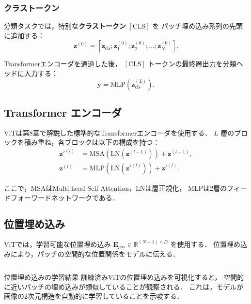 \subsubsection{クラストークン}

分類タスクでは，特別な\textbf{クラストークン} $[\mathrm{CLS}]$ を
パッチ埋め込み系列の先頭に追加する：
\begin{equation}
  \mathbf{z}^{(0)} = [\boldsymbol{z}_{\mathrm{cls}}; \boldsymbol{z}_1^{(0)}; \boldsymbol{z}_2^{(0)}; \ldots; \boldsymbol{z}_N^{(0)}].
\end{equation}

Transformerエンコーダを通過した後，
$[\mathrm{CLS}]$ トークンの最終層出力を分類ヘッドに入力する：
\begin{equation}
  \boldsymbol{y} = \mathrm{MLP}(\boldsymbol{z}_{\mathrm{cls}}^{(L)}).
\end{equation}

\subsection{Transformer エンコーダ}

ViTは第8章で解説した標準的なTransformerエンコーダを使用する．
$L$ 層のブロックを積み重ね，各ブロックは以下の構成を持つ：
\begin{align}
  \boldsymbol{z}'^{(l)} &= \mathrm{MSA}(\mathrm{LN}(\boldsymbol{z}^{(l-1)})) + \boldsymbol{z}^{(l-1)}, \\
  \boldsymbol{z}^{(l)} &= \mathrm{MLP}(\mathrm{LN}(\boldsymbol{z}'^{(l)})) + \boldsymbol{z}'^{(l)}.
\end{align}

ここで，MSAはMulti-head Self-Attention，LNは層正規化，
MLPは2層のフィードフォーワードネットワークである．

\subsection{位置埋め込み}

ViTでは，学習可能な位置埋め込み $\mathbf{E}_{pos} \in \mathbb{R}^{(N+1) \times D}$ を使用する．
位置埋め込みにより，パッチの空間的な位置関係をモデルに伝える．

\begin{column}{位置埋め込みの学習結果}
  訓練済みViTの位置埋め込みを可視化すると，
  空間的に近いパッチの埋め込みが類似していることが観察される．
  これは，モデルが画像の2次元構造を自動的に学習していることを示唆する．
\end{column}

